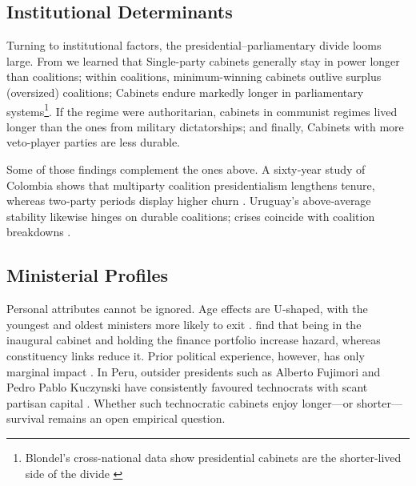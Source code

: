 \documentclass[a4paper, 12pt]{article}
\begin{document}
\subsection{Institutional Determinants}

Turning to institutional factors, the presidential–parliamentary divide looms large.
From \citet{fischer_duration_2012} we learned that Single-party cabinets generally stay in power longer than coalitions; within coalitions, minimum-winning cabinets outlive surplus (oversized) coalitions; Cabinets endure markedly longer in parliamentary systems\footnote{Blondel’s cross-national data show presidential cabinets are the shorter-lived side of the divide \citep{blondel_government_1985}}. If the regime were authoritarian, cabinets in communist regimes lived longer than the ones from military dictatorships; and finally, Cabinets with more veto-player parties are less durable.

Some of those findings complement the ones above.  A sixty‑year study of Colombia shows that multiparty coalition presidentialism lengthens tenure, whereas two‑party periods display higher churn \citep{mejia_es_2021}.  Uruguay’s above‑average stability likewise hinges on durable coalitions; crises coincide with coalition breakdowns \citep{chasquetti_designacion_2013}.


\subsection{Ministerial Profiles}

Personal attributes cannot be ignored.  Age effects are U‑shaped, with the youngest and oldest ministers more likely to exit \citet{fischer_duration_2012}.  \citet{escobar-lemmon_coming_2010} find that being in the inaugural cabinet and holding the finance portfolio increase hazard, whereas constituency links reduce it.  Prior political experience, however, has only marginal impact \citep{escobar-lemmon_coming_2010}.  In Peru, outsider presidents such as Alberto Fujimori and Pedro Pablo Kuczynski have consistently favoured technocrats with scant partisan capital \citep{carreras_presidentes_2013,nercesian_radiografigabinetes_2019}.  Whether such technocratic cabinets enjoy longer—or shorter—survival remains an open empirical question.
\end{document}
